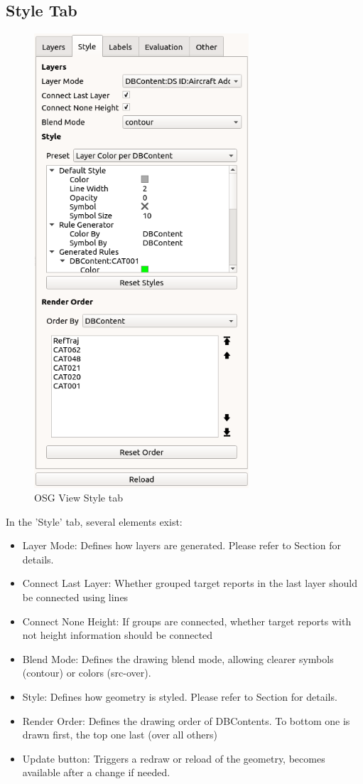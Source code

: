 \subsection{Style Tab}
\label{sec:osgview_style}

\begin{figure}[H]
   \center
    \includegraphics[width=8cm,frame]{figures/osgview_style_tab.png}
  \caption{OSG View Style tab}
\end{figure}

In the 'Style' tab, several elements exist:

\begin{itemize}
 \item Layer Mode: Defines how layers are generated. Please refer to Section  for details.
 \item Connect Last Layer: Whether grouped target reports in the last layer should be connected using lines
 \item Connect None Height: If groups are connected, whether target reports with not height information should be connected
 \item Blend Mode: Defines the drawing blend mode, allowing clearer symbols (contour) or colors (src-over).
 \item Style: Defines how geometry is styled. Please refer to Section  for details.
 \item Render Order: Defines the drawing order of DBContents. To bottom one is drawn first, the top one last (over all others)
 \item Update button: Triggers a redraw or reload of the geometry, becomes available after a change if needed.
\end{itemize} 

